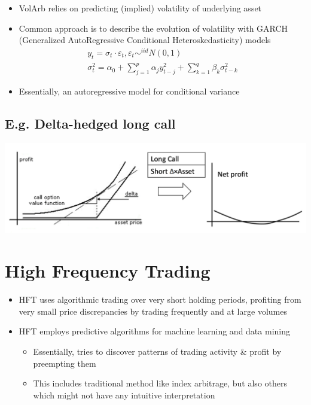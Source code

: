 \documentclass[
  oneside]{book}
\providecommand{\tightlist}{%
  \setlength{\itemsep}{0pt}\setlength{\parskip}{0pt}}
\begin{document}
\begin{itemize}
\tightlist
\item
  VolArb relies on predicting (implied) volatility of underlying asset
\item
  Common approach is to describe the evolution of volatility with GARCH (Generalized AutoRegressive Conditional Heteroskedasticity) models
  \[
  \begin{gathered}
  y_t=\sigma_t \cdot \varepsilon_t, \varepsilon_t \sim^{i i d} N(0,1) \\
  \sigma_t^2=\alpha_0+\sum_{j=1}^p \alpha_j y_{t-j}^2+\sum_{k=1}^q \beta_k \sigma_{t-k}^2
  \end{gathered}
  \]
\item
  Essentially, an autoregressive model for conditional variance
\end{itemize}

\hypertarget{e.g.-delta-hedged-long-call}{%
\subsection{E.g. Delta-hedged long call}\label{e.g.-delta-hedged-long-call}}

\includegraphics{Notes/Obsidian-Attachments/9-Statistical-Arbitrage-13.png}

\hypertarget{high-frequency-trading}{%
\section{High Frequency Trading}\label{high-frequency-trading}}

\begin{itemize}
\tightlist
\item
  HFT uses algorithmic trading over very short holding periods, profiting from very small price discrepancies by trading frequently and at large volumes
\item
  HFT employs predictive algorithms for machine learning and data mining

  \begin{itemize}
  \tightlist
  \item
    Essentially, tries to discover patterns of trading activity \& profit by preempting them
  \item
    This includes traditional method like index arbitrage, but also others which might not have any intuitive interpretation
  \end{itemize}
\end{itemize}
\end{document}
